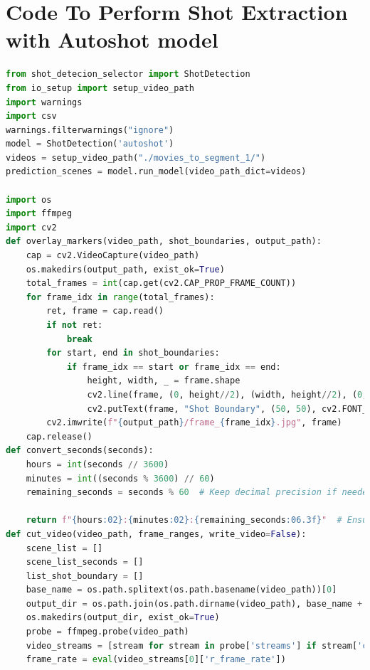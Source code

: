 \documentclass[12pt]{report}
\begin{document}
	\chapter{Code To Perform Shot Extraction with Autoshot model}\label{app:autoshot_code}
	\begin{lstlisting}[language=Python,caption={Autoshot Shot Boundary Extraction Code}]
from shot_detecion_selector import ShotDetection
from io_setup import setup_video_path
import warnings
import csv
warnings.filterwarnings("ignore")
model = ShotDetection('autoshot')
videos = setup_video_path("./movies_to_segment_1/")
prediction_scenes = model.run_model(video_path_dict=videos)

import os
import ffmpeg
import cv2
def overlay_markers(video_path, shot_boundaries, output_path):
    cap = cv2.VideoCapture(video_path)
    os.makedirs(output_path, exist_ok=True)
    total_frames = int(cap.get(cv2.CAP_PROP_FRAME_COUNT))
    for frame_idx in range(total_frames):
        ret, frame = cap.read()
        if not ret:
            break
        for start, end in shot_boundaries:
            if frame_idx == start or frame_idx == end:
                height, width, _ = frame.shape
                cv2.line(frame, (0, height//2), (width, height//2), (0, 0, 255), 5)
                cv2.putText(frame, "Shot Boundary", (50, 50), cv2.FONT_HERSHEY_SIMPLEX, 1, (0, 0, 255), 3)
        cv2.imwrite(f"{output_path}/frame_{frame_idx}.jpg", frame)
    cap.release()
def convert_seconds(seconds):
    hours = int(seconds // 3600)
    minutes = int((seconds % 3600) // 60)
    remaining_seconds = seconds % 60  # Keep decimal precision if needed

    return f"{hours:02}:{minutes:02}:{remaining_seconds:06.3f}"  # Ensure proper formatting
def cut_video(video_path, frame_ranges, write_video=False):
    scene_list = []
    scene_list_seconds = []
    list_shot_boundary = []
    base_name = os.path.splitext(os.path.basename(video_path))[0]
    output_dir = os.path.join(os.path.dirname(video_path), base_name + "Autoshot")
    os.makedirs(output_dir, exist_ok=True)
    probe = ffmpeg.probe(video_path)
    video_streams = [stream for stream in probe['streams'] if stream['codec_type'] == 'video']
    frame_rate = eval(video_streams[0]['r_frame_rate'])
    

\end{lstlisting}
\end{document}
